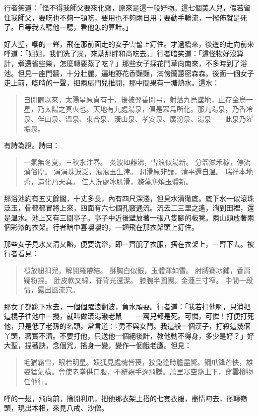 行者笑道：「怪不得我師父要來化齋，原來是這一般好物。這七個美人兒，假若留住我師父，要吃也不夠一頓吃，要用也不夠兩日用；要動手輪流，一擺佈就是死了。且等我去聽他一聽，看他怎的算計。」

好大聖，嚶的一聲，飛在那前面走的女子雲髻上釘住。才過橋來，後邊的走向前來呼道：「姐姐，我們洗了澡，來蒸那胖和尚吃去。」行者暗笑道：「這怪物好沒算計，煮還省些柴，怎麼轉要蒸了吃？」那些女子採花鬥草向南來，不多時到了浴池。但見一座門牆，十分壯麗，遍地野花香豔豔，滿傍蘭蕙密森森。後面一個女子走上前，唿哨的一聲，把兩扇門兒推開，那中間果有一塘熱水。這水：
\begin{quote}
自開闢以來，太陽星原貞有十，後被羿善開弓，射落九烏墜地，止存金烏一星，乃太陽之真火也。天地有九處湯泉，俱是眾烏所化。那九陽泉，乃香冷泉、伴山泉、溫泉、東合泉、潢山泉、孝安泉、廣汾泉、湯泉——此泉乃濯垢泉。
\end{quote}

有詩為證。詩曰：
\begin{quote}
一氣無冬夏，三秋永注春。
炎波如鼎沸，雪浪似湯新。
分溜滋禾稼，停流蕩俗塵。
涓涓珠淚泛，滾滾玉生津。
潤滑原非釀，清平還自溫。
瑞祥本地秀，造化乃天真。
佳人洗處冰肌滑，滌蕩塵煩玉體新。
\end{quote}

那浴池約有五丈餘闊，十丈多長，內有四尺深淺，但見水清徹底。底下水一似滾珠泛玉，骨都都冒將上來，四面有六七個孔竅通流。流去二三里之遙，淌到田裡，還是溫水。池上又有三間亭子。亭子中近後壁放著一張八隻腳的板凳。兩山頭放著兩個彩漆的衣架。行者暗中喜嚶嚶的，一翅飛在那衣架頭上釘住。

那些女子見水又清又熱，便要洗浴，即一齊脫了衣服，搭在衣架上，一齊下去。被行者看見：
\begin{quote}
褪放紐扣兒，解開羅帶結。
酥胸白似銀，玉體渾如雪。
肘膊賽冰鋪，香肩疑粉捏。
肚皮軟又綿，脊背光還潔。
膝腕半圍團，金蓮三寸窄。
中間一段情，露出風流穴。
\end{quote}

那女子都跳下水去，一個個躍浪翻波，負水頑耍。行者道：「我若打他啊，只消把這棍子往池中一攪，就叫做滾湯潑老鼠——一窩兒都是死。可憐，可憐！打便打死他，只是低了老孫的名頭。常言道：『男不與女鬥。我這般一個漢子，打殺這幾個丫頭，著實不濟。不要打他，只送他一個絕後計，教他動不得身，多少是好？」好大聖，捏著訣，念個咒，搖身一變，變作一個餓老鷹。但見：
\begin{quote}
毛猶霜雪，眼若明星。妖狐見處魂皆喪，狡兔逢時膽盡驚。鋼爪鋒芒快，雄姿猛氣橫。會使老拳供口腹，不辭親手逐飛騰。萬里寒空隨上下，穿雲撿物任他行。
\end{quote}

呼的一翅，飛向前，掄開利爪，把他那衣架上搭的七套衣服，盡情叼去，徑轉嶺頭，現出本相，來見八戒、沙僧。

